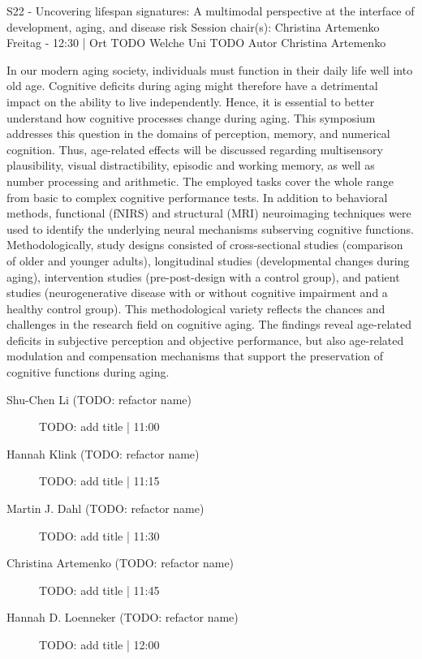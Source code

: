 
            \begin{symposium}
            {S22 - Uncovering lifespan signatures: A multimodal perspective at the interface of development, aging, and disease risk }
            {Session chair(s): Christina Artemenko}
            {Freitag  - 12:30 | Ort TODO}
            {Welche Uni TODO}
            Autor Christina Artemenko

In our modern aging society, individuals must function in their daily life well into old age. Cognitive deficits during aging might therefore have a detrimental impact on the ability to live independently. Hence, it is essential to better understand how cognitive processes change during aging.
This symposium addresses this question in the domains of perception, memory, and numerical cognition. Thus, age-related effects will be discussed regarding multisensory plausibility, visual distractibility, episodic and working memory, as well as number processing and arithmetic. The employed tasks cover the whole range from basic to complex cognitive performance tests.
In addition to behavioral methods, functional (fNIRS) and structural (MRI) neuroimaging techniques were used to identify the underlying neural mechanisms subserving cognitive functions. Methodologically, study designs consisted of cross-sectional studies (comparison of older and younger adults), longitudinal studies (developmental changes during aging), intervention studies (pre-post-design with a control group), and patient studies (neurogenerative disease with or without cognitive impairment and a healthy control group). This methodological variety reflects the chances and challenges in the research field on cognitive aging.
The findings reveal age-related deficits in subjective perception and objective performance, but also age-related modulation and compensation mechanisms that support the preservation of cognitive functions during aging.
            \begin{description}    
            
                \item [Shu-Chen Li  (TODO: refactor name)] TODO: add title \textcolor{mygray}{ | 11:00}    
                
                \item [Hannah Klink (TODO: refactor name)] TODO: add title \textcolor{mygray}{ | 11:15}    
                
                \item [Martin J. Dahl (TODO: refactor name)] TODO: add title \textcolor{mygray}{ | 11:30}    
                
                \item [Christina Artemenko (TODO: refactor name)] TODO: add title \textcolor{mygray}{ | 11:45}    
                
                \item [Hannah D. Loenneker (TODO: refactor name)] TODO: add title \textcolor{mygray}{ | 12:00}    
                
            \end{description} 
            \end{symposium}
            